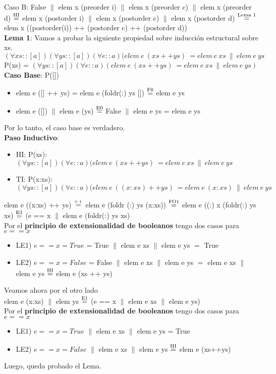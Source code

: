 \documentclass{article}
\begin{document}
Caso B: False $\|$ elem x (preorder i) $\|$ elem x (preorder c) $\|$ elem x (preorder d) $\stackrel{\text{HI}}{=}$ elem x (postorder i) $\|$ elem x (postorder c)  $\|$ elem x (postorder d) $\stackrel{\text{Lema 1}}{=}$ elem x ((postorder(i)) ++ (postorder c) ++ (postorder d))\\

\textbf{Lema 1}: Vamos a probar la siguiente propiedad sobre inducción estructural sobre xs. \\
$(\forall xs :: [a])(\forall ys :: [a])(\forall e::a)(elem \ e \ (xs++ys) \ = elem \ e \ xs \ \| \ elem \ e \ ys$ \\
P(xs) = $(\forall ys :: [a])(\forall e::a)(elem \ e \ (xs++ys) \ = elem \ e \ xs \ \| \ elem \ e \ ys)$ \\
\textbf{Caso Base}: P([])
\begin{itemize}
    \item elem e ([] ++ ys) = elem e (foldr(:) ys []) $\stackrel{\text{F0}}{=}$ elem e ys
    \item elem e ([]) $\|$ elem e (ys) $\stackrel{\text{E0}}{=}$ False $\|$ elem e ys = elem e ys
\end{itemize}
Por lo tanto, el caso base es verdadero. \\
\textbf{Paso Inductivo}: 
\begin{itemize}
    \item HI: P(xs): $(\forall ys :: [a])(\forall e::a)(elem \ e \ (xs++ys) \ = elem \ e \ xs \ \| \ elem \ e \ ys$
    \item TI: P(x:xs): $(\forall ys :: [a])(\forall e::a)(elem \ e \ ((x:xs)++ys) \ = elem \ e \ (x:xs) \ \| \ elem \ e \ ys$
\end{itemize}
elem e ((x:xs) ++ ys) $\stackrel{\text{++}}{=}$ elem e (foldr (:) ys (x:xs)) $\stackrel{\text{FO1}}{=}$ elem e ((:) x (foldr(:) ys xs) $\stackrel{\text{E1}}{=}$ (e == x $\|$ elem e (foldr(:) ys xs) \\
Por el \textbf{principio de extensionalidad de booleanos} tengo dos casos para $e==x$
\begin{itemize}
    \item LE1) $e==x = True$ = True $\|$ elem e xs $\|$ elem e ys $=$ True
    \item LE2) $e==x = False$ = False $\|$ elem e xs $\|$ elem e ys $=$ elem e xs $\|$ elem e ys $\stackrel{\text{HI}}{=}$ elem e (xs ++ ys)
\end{itemize}
Veamos ahora por el otro lado \\
elem e (x:xs) $\|$ elem ys $\stackrel{\text{E1}}{=}$ (e == x $\|$ elem e xs $\|$ elem e ys) \\
Por el \textbf{principio de extensionalidad de booleanos} tengo dos casos para $e==x$
\begin{itemize}
    \item LE1) $e==x = True$ $\|$ elem e xs $\|$ elem e ys = True 
    \item LE2) $e==x = False$ $\|$ elem e xs $\|$ elem e ys $\stackrel{\text{HI}}{=}$ elem e (xs++ys)
\end{itemize}
Luego, queda probado el Lema. 
\end{document}
